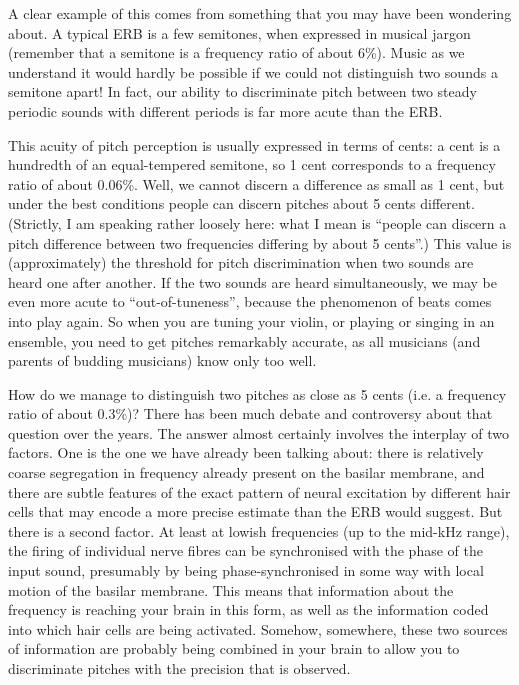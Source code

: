  A clear example of this comes from something that you may have been wondering 
  about. A typical ERB is a few semitones, when expressed in musical jargon 
  (remember that a semitone is a frequency ratio of about 6\%). Music as we 
  understand it would hardly be possible if we could not distinguish two sounds 
  a semitone apart! In fact, our ability to discriminate pitch between two 
  steady periodic sounds with different periods is far more acute than the ERB. 

  This acuity of pitch perception is usually expressed in terms of cents: a 
  cent is a hundredth of an equal-tempered semitone, so 1 cent corresponds to a 
  frequency ratio of about 0.06\%. Well, we cannot discern a difference as 
  small as 1 cent, but under the best conditions people can discern pitches 
  about 5 cents different. (Strictly, I am speaking rather loosely here: what I 
  mean is ``people can discern a pitch difference between two frequencies 
  differing by about 5 cents''.) This value is (approximately) the threshold 
  for pitch discrimination when two sounds are heard one after another. If the 
  two sounds are heard simultaneously, we may be even more acute to 
  ``out-of-tuneness'', because the phenomenon of beats comes into play again. 
  So when you are tuning your violin, or playing or singing in an ensemble, you 
  need to get pitches remarkably accurate, as all musicians (and parents of 
  budding musicians) know only too well. 

  How do we manage to distinguish two pitches as close as 5 cents (i.e. a 
  frequency ratio of about 0.3\%)? There has been much debate and controversy 
  about that question over the years. The answer almost certainly involves the 
  interplay of two factors. One is the one we have already been talking about: 
  there is relatively coarse segregation in frequency already present on the 
  basilar membrane, and there are subtle features of the exact pattern of 
  neural excitation by different hair cells that may encode a more precise 
  estimate than the ERB would suggest. But there is a second factor. At least 
  at lowish frequencies (up to the mid-kHz range), the firing of individual 
  nerve fibres can be synchronised with the phase of the input sound, 
  presumably by being phase-synchronised in some way with local motion of the 
  basilar membrane. This means that information about the frequency is reaching 
  your brain in this form, as well as the information coded into which hair 
  cells are being activated. Somehow, somewhere, these two sources of 
  information are probably being combined in your brain to allow you to 
  discriminate pitches with the precision that is observed. 



